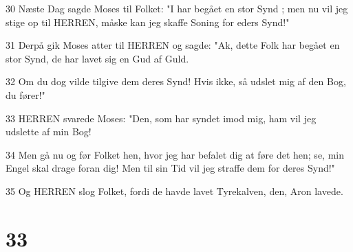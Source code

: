 \par 30 Næste Dag sagde Moses til Folket: "I har begået en stor Synd ; men nu vil jeg stige op til HERREN, måske kan jeg skaffe Soning for eders Synd!"
\par 31 Derpå gik Moses atter til HERREN og sagde: "Ak, dette Folk har begået en stor Synd, de har lavet sig en Gud af Guld.
\par 32 Om du dog vilde tilgive dem deres Synd! Hvis ikke, så udslet mig af den Bog, du fører!"
\par 33 HERREN svarede Moses: "Den, som har syndet imod mig, ham vil jeg udslette af min Bog!
\par 34 Men gå nu og før Folket hen, hvor jeg har befalet dig at føre det hen; se, min Engel skal drage foran dig! Men til sin Tid vil jeg straffe dem for deres Synd!"
\par 35 Og HERREN slog Folket, fordi de havde lavet Tyrekalven, den, Aron lavede.

\chapter{33}

